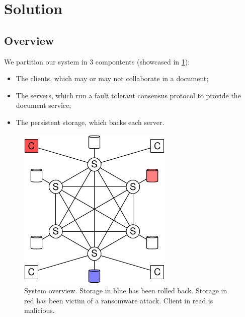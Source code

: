 \section{Solution}

\subsection{Overview}

We partition our system in 3 compontents (showcased in
\ref{fig:overview}):
\begin{itemize}
    \setlength{\itemsep}{0pt}
    \setlength{\parskip}{0pt}
    \setlength{\parsep}{0pt}
    \item The clients, which may or may not collaborate in a
        document;
    \item The servers, which run a fault tolerant consensus
        protocol to provide the document service;
    \item The persistent storage, which backs each server.
\end{itemize}

\begin{figure}[ht]
    \centering
    \includegraphics[width=.5\linewidth]{img/sys-1}
    \caption{System overview. Storage in blue has been rolled
    back. Storage in red has been victim of a ransomware attack.
    Client in read is malicious.}
    \label{fig:overview}
\end{figure}

